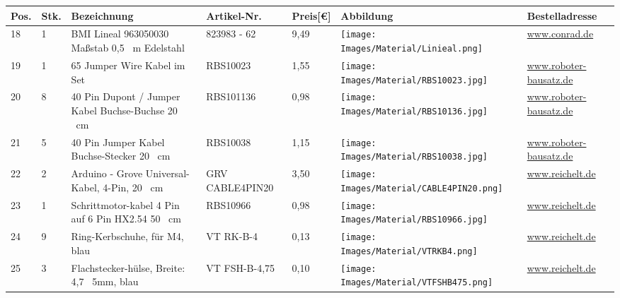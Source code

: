 \begin{center}
\begin{tabularx}{\textwidth}{|p{0.4cm}|p{0.4cm}|X|X|p{1cm}|X|X|}
			\end{tabularx}
		
		\fontsize{8}{10}\selectfont
		\begin{tabularx}{\textwidth}{|p{0.4cm}|p{0.4cm}|X|X|p{1cm}|X|X|}
		\hline 
		\textbf{Pos.} & \textbf{Stk.} & \textbf{Bezeichnung} & \textbf{Artikel-Nr.}& \textbf{Preis[€]} & \textbf{Abbildung} & \textbf{Bestelladresse} \\ \hline	
		18 & 1 & BMI Lineal 963050030 Maßstab 0,5 \ m Edelstahl & 823983 - 62 & 9,49  & \texttt{[image: Images/Material/Linieal.png]} & \href{https://www.conrad.de/de/p/bmi-lineal-963050030-massstab-0-5-m-edelstahl-823983.html}{www.conrad.de} \\
		\hline
		19 & 1 & 65 Jumper Wire Kabel im Set & RBS10023 & 1,55  & \texttt{[image: Images/Material/RBS10023.jpg]} & \href{https://www.roboter-bausatz.de/p/65-jumper-wire-kabel-im-set}{www.roboter-bausatz.de} \\
		\hline
		20 & 8 & 40 Pin Dupont / Jumper Kabel Buchse-Buchse 20 \ cm & RBS101136 & 0,98  & \texttt{[image: Images/Material/RBS10136.jpg]} & \href{https://www.roboter-bausatz.de/p/40-pin-dupont-jumper-kabel-buchse-buchse-20-cm}{www.roboter-bausatz.de} \\
		\hline
		21 & 5 & 40 Pin Jumper Kabel Buchse-Stecker 20 \ cm &  RBS10038 & 1,15  & \texttt{[image: Images/Material/RBS10038.jpg]} & \href{https://www.roboter-bausatz.de/p/40-pin-jumper-kabel-buchse-stecker-20-cm}{www.roboter-bausatz.de} \\
		\hline
		22 & 2 & Arduino - Grove Universal-Kabel, 4-Pin, 20 \ cm &  GRV CABLE4PIN20 & 3,50  & \texttt{[image: Images/Material/CABLE4PIN20.png]} & \href{https://www.reichelt.de/arduino-grove-universal-kabel-4-pin-20cm-5er-pack--grv-cable4pin20-p191148.html}{www.reichelt.de} \\
		\hline
		23 & 1 & Schrittmotor-kabel 4 Pin auf 6 Pin HX2.54 50 \ cm & RBS10966 & 0,98  & \texttt{[image: Images/Material/RBS10966.jpg]} & \href{https://www.roboter-bausatz.de/p/schrittmotorkabel-4-pin-auf-6-pin-hx2.54-50-cm}{www.reichelt.de} \\
		\hline
		24 & 9 & Ring-Kerbschuhe, für M4, blau &  VT RK-B-4 & 0,13 & \texttt{[image: Images/Material/VTRKB4.png]} & \href{https://www.reichelt.de/ring-kerbschuhe-fuer-m4-blau-vt-rk-b-4-p231385.html}{www.reichelt.de} \\
		\hline
		25 & 3 & Flachstecker-hülse, Breite: 4,7 \ 5mm, blau &  VT FSH-B-4,75 & 0,10 & \texttt{[image: Images/Material/VTFSHB475.png]} & \href{https://www.reichelt.de/flachsteckerhuelse-breite-4-75mm-blau-vt-fsh-b-4-75-p231336.html}{www.reichelt.de} \\

\end{tabularx}
\end{center}
